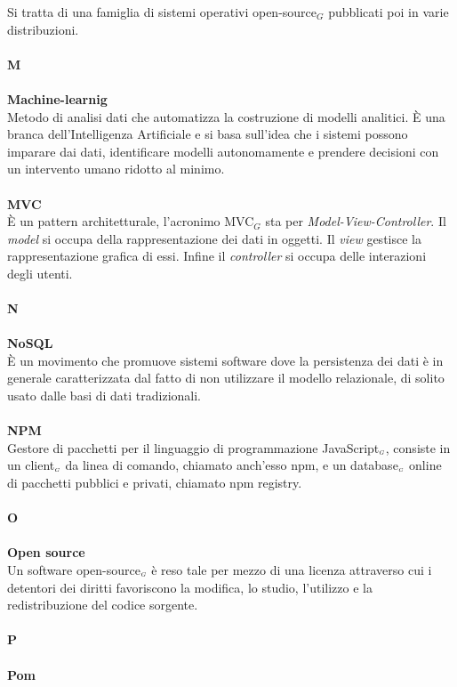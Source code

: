 Si tratta di una famiglia di sistemi operativi open-source$_G$ pubblicati poi in varie distribuzioni.\\
\\
\textbf{M}\\
\\
\textbf{Machine-learnig}\\
Metodo di analisi dati che automatizza la costruzione di modelli analitici. È una branca dell'Intelligenza Artificiale e si basa sull'idea che i sistemi possono imparare dai dati, identificare modelli autonomamente e prendere decisioni con un intervento umano ridotto al minimo.\\
\\
\textbf{MVC}\\
È un pattern architetturale, l'acronimo MVC$_G$ sta per \textit{Model-View-Controller}.
Il \textit{model} si occupa della rappresentazione dei dati in oggetti.
Il \textit{view} gestisce la rappresentazione grafica di essi.
Infine il \textit{controller} si occupa delle interazioni degli utenti.\\
\\
\textbf{N}\\
\\
\textbf{NoSQL}\\
 È un movimento che promuove sistemi software dove la persistenza dei dati è in generale caratterizzata dal fatto di non utilizzare il modello relazionale, di solito usato dalle basi di dati tradizionali.\\
\\
\textbf{NPM}\\
Gestore di pacchetti per il linguaggio di programmazione JavaScript$_{\scaleto{G}{3pt}}$, consiste in un client$_{\scaleto{G}{3pt}}$ da linea di comando, chiamato anch'esso npm, e un database$_{\scaleto{G}{3pt}}$ online di pacchetti pubblici e privati, chiamato npm registry.\\
\\
\textbf{O}\\
\\
\textbf{Open source}\\
Un software open-source$_{\scaleto{G}{3pt}}$ è reso tale per mezzo di una licenza attraverso cui i detentori dei diritti favoriscono la modifica, lo studio, l'utilizzo e la redistribuzione del codice sorgente.\\
\\
\textbf{P}\\
\\
\textbf{Pom}\\
